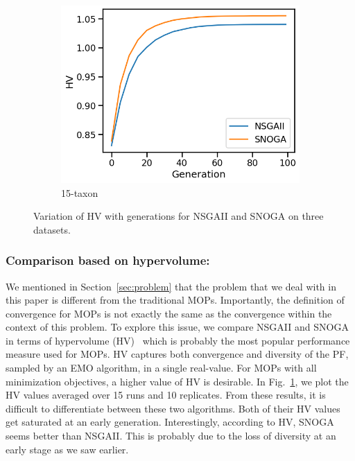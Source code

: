 \begin{figure}[!htbp]
\begin{adjustwidth}{-1cm}{-1cm}
\begin{subfigure}[b]{0.4\textwidth}
			\includegraphics[width=\textwidth]{Figure/15-taxon_hv}
			\caption{15-taxon}
		\end{subfigure}
		\caption{Variation of HV with generations for NSGAII and SNOGA on three datasets.}
		\label{fig:gen_wise_hv}
	\end{adjustwidth}
\end{figure}

\subsubsection{Comparison based on hypervolume:} We mentioned in Section~\ref{sec:problem} that the problem that we deal with in this paper is different from the traditional MOPs. Importantly, the definition of convergence for MOPs is not exactly the same as the convergence within the context of this problem. To explore this issue, we compare NSGAII and SNOGA in terms of hypervolume (HV)~\cite{zitzler1999multiobjective} which is probably the most popular performance measure used for MOPs. HV captures both convergence and diversity of the PF, sampled by an EMO algorithm, in a single real-value. For MOPs with all minimization objectives, a higher value of HV is desirable. In Fig.~\ref{fig:gen_wise_hv}, we plot the HV values averaged over 15 runs and 10 replicates. From these results, it is difficult to differentiate between these two algorithms. Both of their HV values get saturated at an early generation. Interestingly, according to HV, SNOGA seems better than NSGAII. This is probably due to the loss of diversity at an early stage as we saw earlier. 

